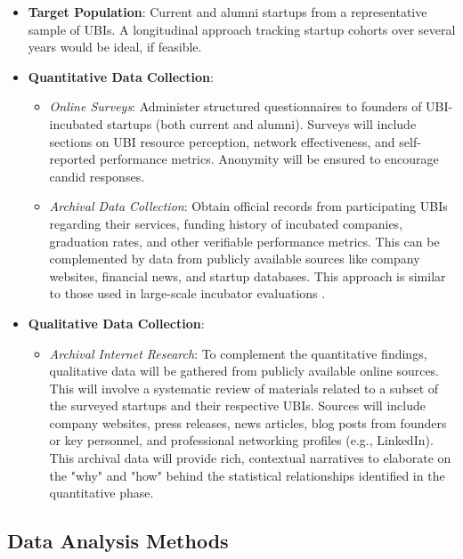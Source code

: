 \documentclass[../Main.tex]{subfiles}
\begin{document}
\begin{itemize}
    \item \textbf{Target Population}: Current and alumni startups from a representative sample of UBIs. A longitudinal approach tracking startup cohorts over several years would be ideal, if feasible.
    \item \textbf{Quantitative Data Collection}:
          \begin{itemize}
              \item \textit{Online Surveys}: Administer structured questionnaires to founders of UBI-incubated startups (both current and alumni). Surveys will include sections on UBI resource perception, network effectiveness, and self-reported performance metrics. Anonymity will be ensured to encourage candid responses.
              \item \textit{Archival Data Collection}: Obtain official records from participating UBIs regarding their services, funding history of incubated companies, graduation rates, and other verifiable performance metrics. This can be complemented by data from publicly available sources like company websites, financial news, and startup databases. This approach is similar to those used in large-scale incubator evaluations \cite{patton2014realising}.
          \end{itemize}
    \item \textbf{Qualitative Data Collection}:
          \begin{itemize}
              \item \textit{Archival Internet Research}: To complement the quantitative findings, qualitative data will be gathered from publicly available online sources. This will involve a systematic review of materials related to a subset of the surveyed startups and their respective UBIs. Sources will include company websites, press releases, news articles, blog posts from founders or key personnel, and professional networking profiles (e.g., LinkedIn). This archival data will provide rich, contextual narratives to elaborate on the "why" and "how" behind the statistical relationships identified in the quantitative phase.
          \end{itemize}
\end{itemize}

\subsection{Data Analysis Methods}
\end{document}
